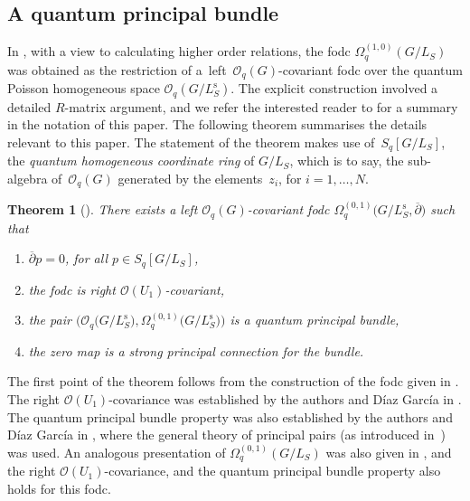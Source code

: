 \documentclass[10pt,a4paper]{amsart}
\numberwithin{equation}{section}
\newtheorem{Theorem}{Theorem}[section]
\newcommand\adel{\overline{\partial}}
\begin{document}
\subsection{A quantum principal bundle} \label{subsection:QPB}

In \cite{HKdR}, with a view to calculating higher order relations, the fodc $\Omega^{(1,0)}_q(G/L_S)$ was obtained as the restriction of a~left~$\mathcal{O}_q(G)$-covariant fodc over the quantum Poisson homogeneous space $\mathcal{O}_q(G/L^{\mathrm{s}}_S)$. The explicit construction involved a detailed $R$-matrix argument, and we refer the interested reader to \cite{CDOBBW} for a summary in the notation of this paper. The following theorem summarises the details relevant to this paper. The statement of the theorem makes use of~$S_q[G/L_S]$, the \emph{quantum homogeneous coordinate ring} of $G/L_S$, which is to say, the sub-algebra of~$\mathcal{O}_q(G)$ generated by the elements~$z_i$, for $i=1, \dots, N$.

\begin{Theorem}[{\cite[Section~3.2]{HKdR}}]
There exists a left $\mathcal{O}_q(G)$-covariant fodc
$\Omega^{(0,1)}_q\big(G/L^{\mathrm{s}}_S,\adel\big)$
such that
\begin{enumerate}\itemsep=0pt
\item[$(1)$] $\adel p = 0$, for all $p \in S_q[G/L_S]$,
\item[$(2)$] the fodc is right $\mathcal{O}(U_1)$-covariant,
\item[$(3)$] the pair $\big(\mathcal{O}_q\big(G/L^{\mathrm{s}}_S\big),   \Omega^{(0,1)}_q\big(G/L^{\mathrm{s}}_S\big)\big)$ is a quantum principal bundle,
\item[$(4)$] the zero map is a strong principal connection for the bundle.
\end{enumerate}
\end{Theorem}

The first point of the theorem follows from the construction of the fodc given in \cite[Section~3.2]{HKdR}. The right $\mathcal{O}(U_1)$-covariance was established by the authors and D\'iaz Garc\'ia in \cite[Lemma~5.5]{CDOBBW}. The quantum principal bundle property was also established by the authors and D\'iaz Garc\'ia in \cite[Proposition~5.6]{CDOBBW}, where the general theory of principal pairs (as introduced in~\cite{BwGrass,GAPP}) was used. An analogous presentation of $\Omega^{(0,1)}_q(G/L_S)$ was also given in \cite[Section~3.2]{HKdR}, and the right $\mathcal{O}(U_1)$-covariance, and the quantum principal bundle property also holds for this fodc.
\end{document}

